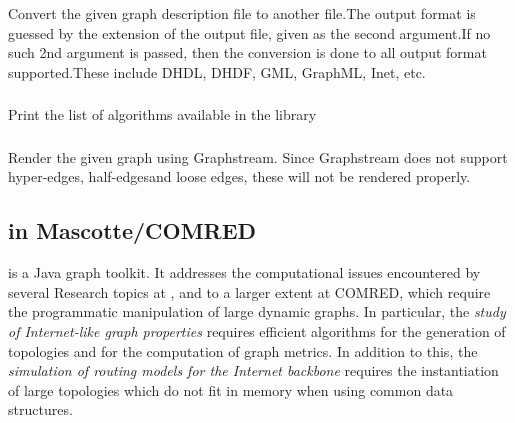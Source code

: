 \documentclass{article}
\begin{document}
\subsubsection{}
Convert the given graph description file to another file.The output format is guessed by the extension of the output file, given as
the second argument.If no such 2nd argument is passed, then the conversion is done to all output format supported.These include DHDL, DHDF, GML, GraphML, Inet, etc.
\subsubsection{}

Print the list of algorithms available in the library

\subsubsection{}
Render the given graph using Graphstream. Since Graphstream does not support hyper-edges, half-edgesand loose edges, these will not be rendered properly.

\subsubsection{}


\subsection{\grph in Mascotte/COMRED}


\grph is a Java graph toolkit. It addresses the computational issues encountered
by several Research topics at \coati, and to a larger extent at COMRED, which require the programmatic
manipulation of large dynamic graphs. In particular,
the {\em study of Internet-like graph properties}  requires
efficient algorithms for the generation of topologies and for
the computation of graph metrics. In addition to this,
the {\em simulation of routing models for the Internet
backbone} requires the instantiation of large topologies which do
not fit in memory when using common data structures.
\end{document}
